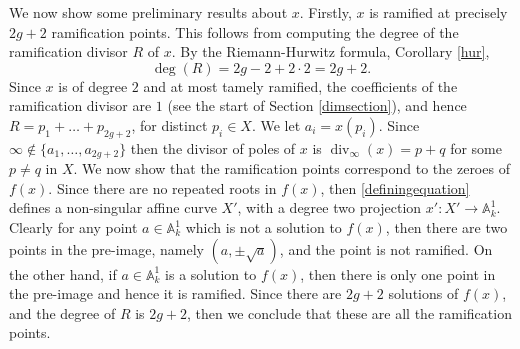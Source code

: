 \documentclass[draft, 11pt]{article} %
\theoremstyle{plain}
\theoremstyle{remark}
\DeclareMathOperator{\di}{div}
\begin{document}
We now show some preliminary results about $x$. 
Firstly, $x$ is ramified at precisely $2g + 2$ ramification points.
This follows from computing the degree of the ramification divisor $R$ of $x$.
By the Riemann-Hurwitz formula, Corollary \ref{hur},
\[ 
\deg(R) = 2g -2 +2\cdot 2 = 2g + 2.
\]
Since $x$ is of degree $2$ and at most tamely ramified, the coefficients of the ramification divisor are $1$ (see the start of Section \ref{dimsection}), and hence $R = p_1 + \ldots + p_{2g+2}$, for distinct $p_i\in X$.
We let $a_i = x(p_i)$.
Since $\infty \notin \{a_1,\ldots ,a_{2g+2}\}$ then the divisor of poles of $x$ is $\di_{\infty}(x) = p + q$ for some $p \neq q $ in $X$.
We now show that the ramification points correspond to the zeroes of $f(x)$.
Since there are no repeated roots in $f(x)$, then \eqref{definingequation} defines a non-singular affine curve $X'$, with a degree two projection $x': X'\rightarrow \mathbb A_k^1$.
Clearly for any point $a\in \mathbb A_k^1$ which is not a solution to $f(x)$, then there are two points in the pre-image, namely $(a,\pm \sqrt{a})$, and the point is not ramified.
On the other hand, if $a\in \mathbb A_k^1$ is a solution to $f(x)$, then there is only one point in the pre-image and hence it is ramified.
Since there are $2g+2$ solutions of $f(x)$, and the degree of $R$ is $2g+2$, then we conclude that these are all the ramification points.
\end{document}
